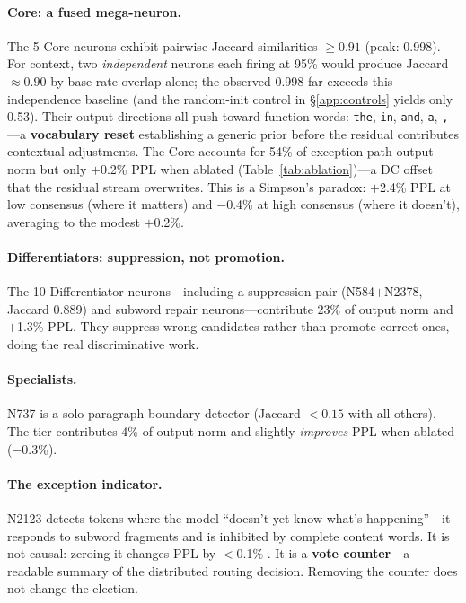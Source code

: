 \documentclass{article}
\begin{document}
\paragraph{Core: a fused mega-neuron.}
The 5 Core neurons exhibit pairwise Jaccard similarities $\geq 0.91$
(peak: 0.998).
For context, two \emph{independent} neurons each firing at 95\% would produce
Jaccard $\approx 0.90$ by base-rate overlap alone; the observed 0.998 far
exceeds this independence baseline (and the random-init control in
\S\ref{app:controls} yields only 0.53).
Their output directions all push toward function words:
\texttt{the}, \texttt{in}, \texttt{and}, \texttt{a}, \texttt{,}---a
\textbf{vocabulary reset} establishing a generic prior before the residual
contributes contextual adjustments.
The Core accounts for 54\% of exception-path output norm but only $+$0.2\%
PPL when ablated (Table~\ref{tab:ablation})---a DC offset that the residual
stream overwrites.
This is a Simpson's paradox: $+$2.4\% PPL at low consensus (where it matters)
and $-$0.4\% at high consensus (where it doesn't), averaging to the modest
$+$0.2\%.

\paragraph{Differentiators: suppression, not promotion.}
The 10 Differentiator neurons---including a suppression pair
(N584$+$N2378, Jaccard 0.889) and subword repair neurons---contribute 23\%
of output norm and $+$1.3\% PPL.
They suppress wrong candidates rather than promote correct ones, doing the
real discriminative work.

\paragraph{Specialists.}
N737 is a solo paragraph boundary detector (Jaccard $< 0.15$ with all others).
The tier contributes 4\% of output norm and slightly \emph{improves} PPL when
ablated ($-$0.3\%).

\paragraph{The exception indicator.}
N2123 detects tokens where the model ``doesn't yet know what's happening''---it
responds to subword fragments and is inhibited by complete content words.
It is not causal: zeroing it changes PPL by $<$0.1\% \citep{balogh2026discrete}.
It is a \textbf{vote counter}---a readable summary of the distributed routing
decision. Removing the counter does not change the election.
\end{document}
